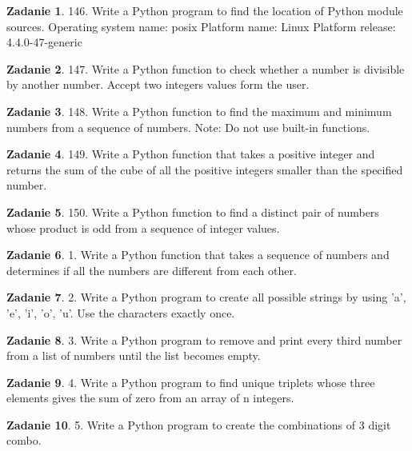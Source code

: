 \documentclass[11pt]{article}
\theoremstyle{definition}
\newtheorem{zadanie}{Zadanie}
\begin{document}
\begin{zadanie}
146. Write a Python program to find the location of Python module sources.
Operating system name:
posix
Platform name:
Linux
Platform release:
4.4.0-47-generic
\end{zadanie}

\begin{zadanie}
147. Write a Python function to check whether a number is divisible by another number. Accept two integers values form the user.
\end{zadanie}

\begin{zadanie}
148. Write a Python function to find the maximum and minimum numbers from a sequence of numbers.
Note: Do not use built-in functions.
\end{zadanie}

\begin{zadanie}
149. Write a Python function that takes a positive integer and returns the sum of the cube of all the positive integers smaller than the specified number.
\end{zadanie}

\begin{zadanie}
150. Write a Python function to find a distinct pair of numbers whose product is odd from a sequence of integer values.
\end{zadanie}
\begin{zadanie}
1. Write a Python function that takes a sequence of numbers and determines if all the numbers are different from each other.
\end{zadanie}

\begin{zadanie}
2. Write a Python program to create all possible strings by using 'a', 'e', 'i', 'o', 'u'. Use the characters exactly once.
\end{zadanie}

\begin{zadanie}
3. Write a Python program to remove and print every third number from a list of numbers until the list becomes empty.
\end{zadanie}

\begin{zadanie}
4. Write a Python program to find unique triplets whose three elements gives the sum of zero from an array of n integers.
\end{zadanie}

\begin{zadanie}
5. Write a Python program to create the combinations of 3 digit combo.
\end{zadanie}
\end{document}
